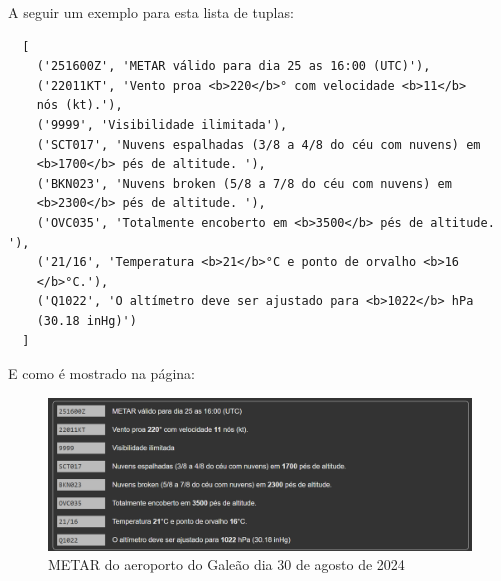 A seguir um exemplo para esta lista de tuplas:

\begin{verbatim}
  [
    ('251600Z', 'METAR válido para dia 25 as 16:00 (UTC)'),
    ('22011KT', 'Vento proa <b>220</b>° com velocidade <b>11</b> 
    nós (kt).'),
    ('9999', 'Visibilidade ilimitada'),
    ('SCT017', 'Nuvens espalhadas (3/8 a 4/8 do céu com nuvens) em 
    <b>1700</b> pés de altitude. '),
    ('BKN023', 'Nuvens broken (5/8 a 7/8 do céu com nuvens) em 
    <b>2300</b> pés de altitude. '),
    ('OVC035', 'Totalmente encoberto em <b>3500</b> pés de altitude. '),
    ('21/16', 'Temperatura <b>21</b>°C e ponto de orvalho <b>16
    </b>°C.'),
    ('Q1022', 'O altímetro deve ser ajustado para <b>1022</b> hPa 
    (30.18 inHg)')
  ]
\end{verbatim}

E como é mostrado na página:

\begin{figure}[ht]
  \begin{center}
  \includegraphics[width=400pt]{img/metar-sbgl.png}
  \caption{METAR do aeroporto do Galeão dia 30 de agosto de 2024}
  \label{fig:metar-30-08}
  \end{center}
\end{figure}
